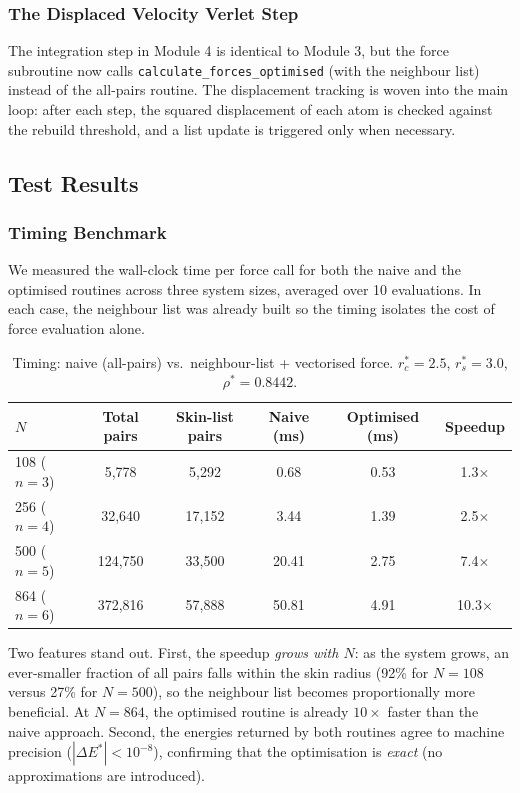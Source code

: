 \subsubsection{The Displaced Velocity Verlet Step}

The integration step in Module 4 is identical to Module 3, but the force subroutine now calls \texttt{calculate\_forces\_optimised} (with the neighbour list) instead of the all-pairs routine. The displacement tracking is woven into the main loop: after each step, the squared displacement of each atom is checked against the rebuild threshold, and a list update is triggered only when necessary.

\subsection{Test Results}

\subsubsection{Timing Benchmark}

We measured the wall-clock time per force call for both the naive and the optimised routines across three system sizes, averaged over 10 evaluations. In each case, the neighbour list was already built so the timing isolates the cost of force evaluation alone.

\begin{table}[H]
    \small
    \centering
    \begin{tabular}{lccccc}
        \toprule
        \textbf{$N$} & \textbf{Total pairs} & \textbf{Skin-list pairs} & \textbf{Naive (ms)} & \textbf{Optimised (ms)} & \textbf{Speedup} \\
        \midrule
        108 ($n=3$) & 5{,}778   & 5{,}292  & 0.68  & 0.53 & 1.3$\times$  \\
        256 ($n=4$) & 32{,}640  & 17{,}152 & 3.44  & 1.39 & 2.5$\times$  \\
        500 ($n=5$) & 124{,}750 & 33{,}500 & 20.41 & 2.75 & 7.4$\times$  \\
        864 ($n=6$) & 372{,}816 & 57{,}888 & 50.81 & 4.91 & 10.3$\times$ \\
        \bottomrule
    \end{tabular}
    \caption{Timing: naive (all-pairs) vs.\ neighbour-list + vectorised force. $r_c^* = 2.5$, $r_s^* = 3.0$, $\rho^* = 0.8442$.}
    \label{tab:m4_timing}
\end{table}
Two features stand out. First, the speedup \emph{grows with $N$}: as the system grows, an ever-smaller fraction of all pairs falls within the skin radius (92\% for $N=108$ versus 27\% for $N=500$), so the neighbour list becomes proportionally more beneficial. At $N=864$, the optimised routine is already $10\times$ faster than the naive approach. Second, the energies returned by both routines agree to machine precision ($|\Delta E^*| < 10^{-8}$), confirming that the optimisation is \emph{exact} (no approximations are introduced).
